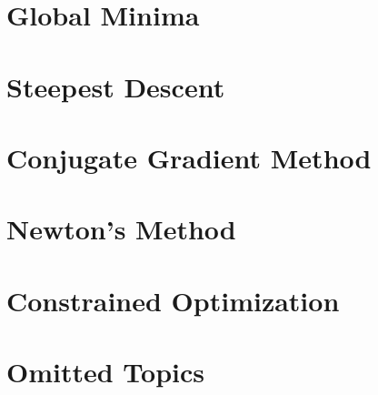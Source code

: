 \section{Global Minima}

\section{Steepest Descent}

\section{Conjugate Gradient Method}

\section{Newton's Method}

\section{Constrained Optimization}

\section{Omitted Topics}
